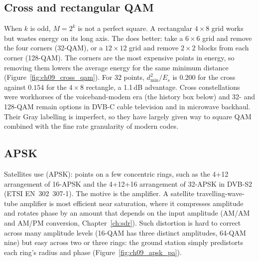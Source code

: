 \subsection{Cross and rectangular QAM}

When $k$ is odd, $M=2^k$ is not a perfect square. A rectangular $4\times8$ grid works but wastes
energy on its long axis. The  does better: take a $6\times6$ grid and
remove the four corners (32-QAM), or a $12\times12$ grid and remove $2\times2$ blocks from each
corner (128-QAM). The corners are the most expensive points in energy, so removing them lowers
the average energy for the same minimum distance (Figure~\ref{fig:ch09_cross_qam}). For 32 points,
$d_{\min}^2/E_s$ is $0.200$ for the cross against $0.154$ for the $4\times8$ rectangle, a 1.1\,dB
advantage. Cross constellations were workhorses of the voiceband-modem era (the history box
below) and 32- and 128-QAM remain options in DVB-C cable television and in microwave backhaul.
Their Gray labelling is imperfect, so they have largely given way to square QAM combined with the
fine rate granularity of modern codes.


\subsection{APSK}

Satellites use  (APSK): points on a few concentric rings,
such as the 4+12 arrangement of 16-APSK and the 4+12+16 arrangement of 32-APSK in DVB-S2 (ETSI
EN~302~307-1). The motive is the amplifier. A satellite travelling-wave-tube amplifier is most
efficient near saturation, where it compresses amplitude and rotates phase by an amount that
depends on the input amplitude (AM/AM and AM/PM conversion, Chapter~\ref{ch:sdr}). Such
distortion is hard to correct across many amplitude levels (16-QAM has three distinct amplitudes,
64-QAM nine) but easy across two or three rings: the ground station simply predistorts each ring's
radius and phase (Figure~\ref{fig:ch09_apsk_pa}).


